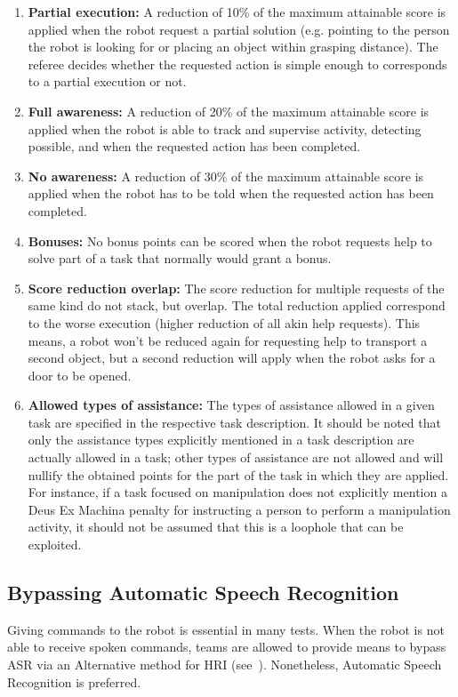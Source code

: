 \begin{enumerate}
	\item \textbf{Partial execution:} A reduction of 10\% of the maximum attainable score is applied when the robot request a partial solution (e.g. pointing to the person the robot is looking for or placing an object within grasping distance).
	The referee decides whether the requested action is simple enough to corresponds to a partial execution or not.

	\item \textbf{Full awareness:} A reduction of 20\% of the maximum attainable score is applied when the robot is able to track and supervise activity, detecting possible, and when the requested action has been completed.

	\item \textbf{No awareness:} A reduction of 30\% of the maximum attainable score is applied when the robot has to be told when the requested action has been completed.

	\item \textbf{Bonuses:} No bonus points can be scored when the robot requests help to solve part of a task that normally would grant a bonus.

	\item \textbf{Score reduction overlap:} The score reduction for multiple requests of the same kind do not stack, but overlap.
	The total reduction applied correspond to the worse execution (higher reduction of all akin help requests).
	This means, a robot won't be reduced again for requesting help to transport a second object, but a second reduction will apply when the robot asks for a door to be opened.

	\item \textbf{Allowed types of assistance:} The types of assistance allowed in a given task are specified in the respective task description.
	It should be noted that only the assistance types explicitly mentioned in a task description are actually allowed in a task; other types of assistance are not allowed and will nullify the obtained points for the part of the task in which they are applied.
	For instance, if a task focused on manipulation does not explicitly mention a Deus Ex Machina penalty for instructing a person to perform a manipulation activity, it should not be assumed that this is a loophole that can be exploited.
\end{enumerate}

\subsection{Bypassing Automatic Speech Recognition}
\label{rule:asrcontinue}
Giving commands to the robot is essential in many tests.
When the robot is not able to receive spoken commands, teams are allowed to provide means to bypass ASR via an Alternative method for HRI (see~).
Nonetheless, Automatic Speech Recognition is preferred.

